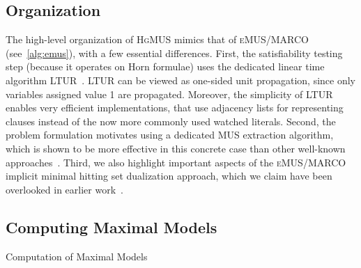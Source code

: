 \documentclass{llncs}
\newcommand{\hgmus}{\textsc{HgMUS}\xspace}
\newcommand{\emus}{\textsc{eMUS}\xspace}
\begin{document}
\subsection{Organization}

The high-level organization of \hgmus mimics that of \emus/MARCO
(see~\autoref{alg:emus}), with a few essential differences.
First, the satisfiability testing step (because it operates on Horn
formulae) uses the dedicated linear time algorithm
LTUR~\cite{minoux-ipl88}. LTUR can be viewed as one-sided unit
propagation, since only variables assigned value 1 are propagated.
Moreover, the simplicity of LTUR enables very efficient
implementations, that use adjacency lists for representing clauses
instead of the now more commonly used watched literals.
Second, the problem formulation motivates using a dedicated MUS
extraction algorithm, which is shown to be more effective in this
concrete case than other well-known approaches~\cite{blms-aicomm12}. 
Third, we also highlight important aspects of the \emus/MARCO implicit
minimal hitting set dualization approach, which we claim have been
overlooked in earlier work~\cite{vescovi-phd11,sebastiani-tr15}.



\subsection{Computing Maximal Models}

\begin{algorithm}[t]
{\small 
\DontPrintSemicolon
\SetAlgoNoLine
\LinesNumbered
\SetFillComment
\SetKw{KwNot}{not\xspace}
\SetKw{KwAnd}{and\xspace}
\SetKw{KwOr}{or\xspace}
 \LinesNotNumbered
\LinesNumbered
{}
\smallskip
\SetAlgoVlined
  \;
   \;
  \lIf{\KwNot } { \Return{} } 
  
   \While{}{
   	 \;
  
   	\;
   	\leIf{}
   	{
   		\;
   
   	}{
   		}
   }
  \Return{}  \SetAlgoShortEnd
}
\caption{Computation of Maximal Models \label{alg:mxm}}
\end{algorithm}
\end{document}
